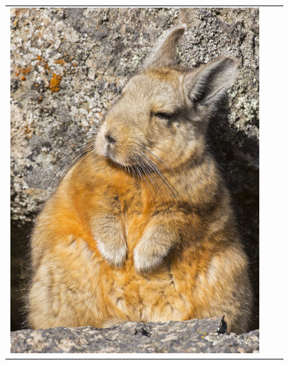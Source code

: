 \documentclass[12pt,a4paper]{beamer}
\begin{document}
\begin{frame}
\begin{tabular}{ccc}
        \includegraphics[scale=0.75]{../pictures/viscacha.png} \\
    \end{tabular}
\end{frame}
\end{document}
